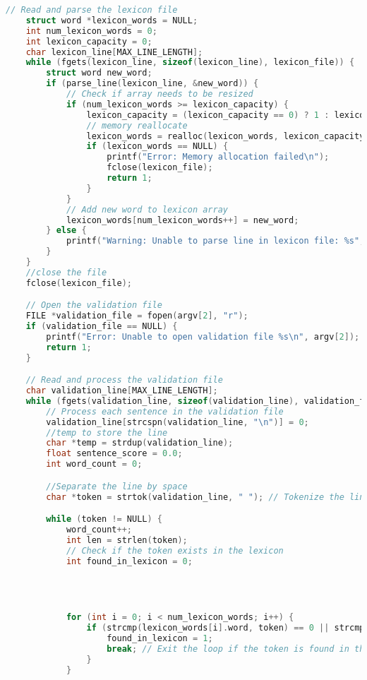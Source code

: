 \documentclass{article}
\begin{document}
\begin{lstlisting}[language=C]
    // Read and parse the lexicon file
    struct word *lexicon_words = NULL;
    int num_lexicon_words = 0;
    int lexicon_capacity = 0;
    char lexicon_line[MAX_LINE_LENGTH];
    while (fgets(lexicon_line, sizeof(lexicon_line), lexicon_file)) {
        struct word new_word;
        if (parse_line(lexicon_line, &new_word)) {
            // Check if array needs to be resized
            if (num_lexicon_words >= lexicon_capacity) {
                lexicon_capacity = (lexicon_capacity == 0) ? 1 : lexicon_capacity * 2;
                // memory reallocate
                lexicon_words = realloc(lexicon_words, lexicon_capacity * sizeof(struct word));
                if (lexicon_words == NULL) {
                    printf("Error: Memory allocation failed\n");
                    fclose(lexicon_file);
                    return 1;
                }
            }
            // Add new word to lexicon array
            lexicon_words[num_lexicon_words++] = new_word;
        } else {
            printf("Warning: Unable to parse line in lexicon file: %s", lexicon_line);
        }
    }
    //close the file
    fclose(lexicon_file);

    // Open the validation file
    FILE *validation_file = fopen(argv[2], "r");
    if (validation_file == NULL) {
        printf("Error: Unable to open validation file %s\n", argv[2]);
        return 1;
    }

    // Read and process the validation file
    char validation_line[MAX_LINE_LENGTH];
    while (fgets(validation_line, sizeof(validation_line), validation_file)) {
        // Process each sentence in the validation file
        validation_line[strcspn(validation_line, "\n")] = 0;
        //temp to store the line
        char *temp = strdup(validation_line);
        float sentence_score = 0.0;
        int word_count = 0;

        //Separate the line by space
        char *token = strtok(validation_line, " "); // Tokenize the line by space

        while (token != NULL) {
            word_count++;
            int len = strlen(token);
            // Check if the token exists in the lexicon
            int found_in_lexicon = 0;


            

            for (int i = 0; i < num_lexicon_words; i++) {
                if (strcmp(lexicon_words[i].word, token) == 0 || strcmp(":)", token) == 0) {
                    found_in_lexicon = 1;
                    break; // Exit the loop if the token is found in the lexicon
                }
            }
            


\end{lstlisting}
\end{document}
